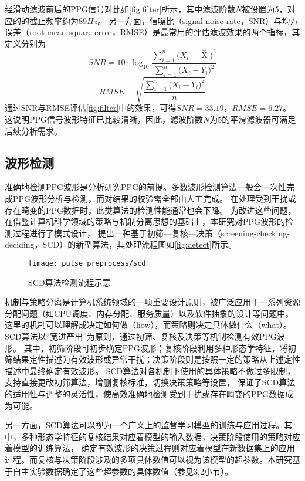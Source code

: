 经滑动滤波前后的PPG信号对比如\autoref{fig:filter}所示，其中滤波阶数$N$被设置为5，对应的的截止频率约为89$Hz$。
另一方面，信噪比（signal-noise rate，SNR）与均方误差（root mean square error，RMSE）是最常用的评估滤波效果的两个指标，其定义分别为
\begin{equation}
    \label{equ:snr}
    SNR=10 \cdot \log_{10}\frac{\sum_{i=1}^{n}{(X_i-\mathop{X} \limits^-})^2}{\sum_{i=1}^{n}{(X_i-Y_i})^2}
\end{equation}
\begin{equation}
    \label{equ:rmse}
    RMSE=\sqrt{\frac{\sum_{i=1}^{n}{(X_i-Y_i})^2}{n}}
\end{equation}
通过SNR与RMSE评估\autoref{fig:filter}中的效果，可得$SNR=33.19$，$RMSE=6.27$。
这说明PPG信号波形特征已比较清晰，因此，滤波阶数$N$为5的平滑滤波器可满足后续分析需求。

\subsection{波形检测}
准确地检测PPG波形是分析研究PPG的前提。多数波形检测算法一般会一次性完成PPG波形分析与检测，而对结果的校验需全部由人工完成\cite{Zhang2010,Chen2021,Allen2007,Feng2018,FengJiang2018}。
在处理受到干扰或存在畸变的PPG数据时，此类算法的检测性能通常也会下降。
为改进这些问题，在借鉴计算机科学领域的策略与机制分离思想的基础上\cite{Levin1975}，本研究对PPG波形的检测过程进行了模式设计，
提出一种基于初筛—复核—决策（screening-checking-deciding，SCD）的新型算法，其处理流程图如\autoref{fig:detect}所示。

\begin{figure}[htbp]
    \centering
    \texttt{[image: pulse\_preprocess/scd]}
    \caption{\label{fig:detect}SCD算法检测流程示意}
\end{figure}

机制与策略分离是计算机系统领域的一项重要设计原则，被广泛应用于一系列资源分配问题（如CPU调度、内存分配、服务质量）以及软件抽象的设计等问题中\cite{Wulf1974,Levin1975,Brinch2001}。
这里的机制可以理解成决定如何做（how），而策略则决定具体做什么（what）。
SCD算法以“宽进严出”为原则，通过初筛、复核及决策等机制检测有效PPG波形。
其中，初筛阶段可初步确定PPG波形；复核阶段利用多种形态学特征，将初筛结果定性描述为有效波形或异常干扰；决策阶段则是按照一定的策略从上述定性描述中最终确定有效波形。
SCD算法对各机制下使用的具体策略不做过多限制，支持直接更改初筛算法，增删复核标准，切换决策策略等设置，
保证了SCD算法的适用性与调整的灵活性，使高效准确地检测受到干扰或存在畸变的PPG数据成为可能。

另一方面，SCD算法可以视为一个广义上的监督学习模型的训练与应用过程\cite{Zhou2016}。其中，多种形态学特征的复核结果对应着模型的输入数据，决策阶段使用的策略对应着模型的训练算法，
确定有效波形的决策过程则对应着模型在新数据集上的应用过程。而复核与决策阶段涉及的多项具体数值可以视为该模型的超参数。本研究基于自主实验数据确定了这些超参数的具体数值（参见3.2小节）。


